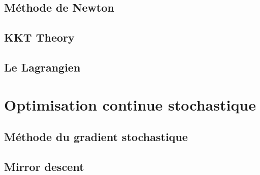 \documentclass[12pt]{book}
\begin{document}
\subsection{Méthode de Newton}
\subsection{KKT Theory}
\subsection{Le Lagrangien}
\section{Optimisation continue stochastique}
\subsection{Méthode du gradient stochastique}
\subsection{Mirror descent}
\end{document}
